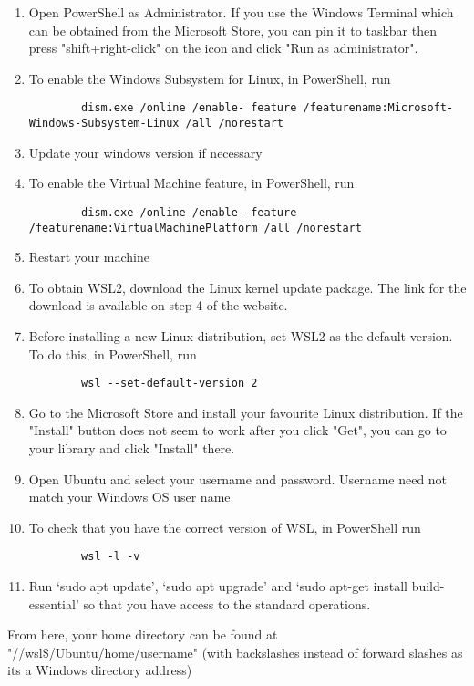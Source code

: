 \begin{enumerate}
    \item Open PowerShell as Administrator. If you use the Windows Terminal
        which can be obtained from the Microsoft Store, you can pin it to taskbar then
        press "shift+right-click" on the icon and click "Run as administrator".
    \item To enable the Windows Subsystem for Linux, in PowerShell, run
        \begin{lstlisting}
        dism.exe /online /enable- feature /featurename:Microsoft-Windows-Subsystem-Linux /all /norestart
        \end{lstlisting}
    \item Update your windows version if necessary
    \item To enable the Virtual Machine feature, in PowerShell, run
        \begin{lstlisting}
        dism.exe /online /enable- feature /featurename:VirtualMachinePlatform /all /norestart
        \end{lstlisting}
    \item Restart your machine
    \item To obtain WSL2, download the Linux kernel update package. The link for the download is
        available on step 4 of the website.
    \item Before installing a new Linux distribution, set WSL2 as the default version. To do this,
        in PowerShell, run
        \begin{lstlisting}
        wsl --set-default-version 2
        \end{lstlisting}
    \item Go to the Microsoft Store and install your favourite Linux distribution. If the "Install"
        button does not seem to work after you click "Get", you can go to your library and click
        "Install" there.
    \item Open Ubuntu and select your username and password. Username need not match your Windows
        OS user name
    \item To check that you have the correct version of WSL, in PowerShell run
        \begin{lstlisting}
        wsl -l -v
        \end{lstlisting}
    \item Run `sudo apt update', `sudo apt upgrade' and `sudo apt-get install
        build-essential' so that you have access to the standard operations.
\end{enumerate}
From here, your home directory can be found at "//wsl\$/Ubuntu/home/username"
(with backslashes instead of forward slashes as its a Windows directory address)

